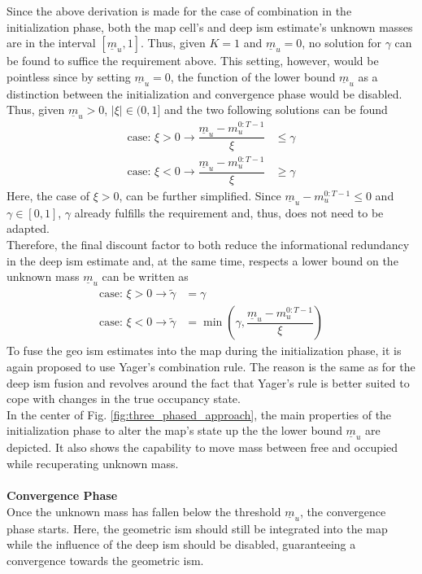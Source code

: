 Since the above derivation is made for the case of combination in the initialization phase, both the map cell's and deep \gls{ism} estimate's unknown masses are in the interval $[\underline{m}_u,1]$. Thus, given $K=1$ and $\underline{m}_u = 0$, no solution for $\gamma$ can be found to suffice the requirement above. This setting, however, would be pointless since by setting $\underline{m}_u = 0$, the function of the lower bound $\underline{m}_u$ as a distinction between the initialization and convergence phase would be disabled.
Thus, given $\underline{m}_u > 0$, $|\xi| \in (0,1]$ and the two following solutions can be found 
\begin{align}
	\text{case: } \xi > 0 \rightarrow \dfrac{\underline{m}_u -m_{u}^{0:T-1}}{\xi} &\leq \gamma\\
	\text{case: } \xi < 0 \rightarrow \dfrac{\underline{m}_u -m_{u}^{0:T-1}}{\xi} &\geq \gamma 
\end{align}
Here, the case of $\xi > 0$, can be further simplified. Since $\underline{m}_u -m_{u}^{0:T-1} \leq 0$ and $\gamma \in [0,1]$, $\gamma$ already fulfills the requirement and, thus, does not need to be adapted.\\
Therefore, the final discount factor to both reduce the informational redundancy in the deep \gls{ism} estimate and, at the same time, respects a lower bound on the unknown mass $\underline{m}_{u}$ can be written as 
\begin{align}
	\text{case: } \xi > 0 \rightarrow \tilde{\gamma} &= \gamma\\
%
	\text{case: } \xi < 0 \rightarrow \tilde{\gamma} &= \min \left(\gamma, \dfrac{\underline{m}_u -m_{u}^{0:T-1}}{\xi} \right)
\end{align}
To fuse the geo \gls{ism} estimates into the map during the initialization phase, it is again proposed to use Yager's combination rule. The reason is the same as for the deep \gls{ism} fusion and revolves around the fact that Yager's rule is better suited to cope with changes in the true occupancy state.\\
In the center of Fig. \ref{fig:three_phased_approach}, the main properties of the initialization phase to alter the map's state up the the lower bound $\underline{m}_{u}$ are depicted. It also shows the capability to move mass between free and occupied while recuperating unknown mass. 
\\
\\
\textbf{Convergence Phase}\\
Once the unknown mass has fallen below the threshold $\underline{m}_u$, the convergence phase starts. Here, the geometric \gls{ism} should still be integrated into the map while the influence of the deep \gls{ism} should be disabled, guaranteeing a convergence towards the geometric \gls{ism}.
